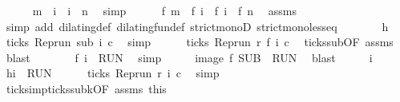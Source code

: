 \begin{isabellebody}
\ \ \ \ \isamarkupfalse%
\ {\isacartoucheopen}m\ {\isacharless}\ i\ {\isasymand}\ i\ {\isacharless}\ n{\isacartoucheclose}\ \isamarkupfalse%
\ simp\isanewline
\ \ \ \ \isamarkupfalse%
\ {\isacartoucheopen}f\ m\ {\isacharless}\ f\ i\ {\isasymand}\ f\ i\ {\isacharless}\ {\isacharparenleft}f\ n{\isacharparenright}{\isacartoucheclose}\ \isamarkupfalse%
\ assms\isanewline
\ \ \ \ \ \ \isamarkupfalse%
\ {\isacharparenleft}simp\ add{\isacharcolon}\ dilating{\isacharunderscore}def\ dilating{\isacharunderscore}fun{\isacharunderscore}def\ strict{\isacharunderscore}monoD\ strict{\isacharunderscore}mono{\isacharunderscore}less{\isacharunderscore}eq{\isacharparenright}\isanewline
\ \ \ \ \isamarkupfalse%
\ \isamarkupfalse%
\ h\ \isamarkupfalse%
\ {\isacartoucheopen}ticks\ {\isacharparenleft}{\isacharparenleft}Rep{\isacharunderscore}run\ sub{\isacharparenright}\ i\ c{\isacharparenright}{\isacartoucheclose}\ \isamarkupfalse%
\ simp\isanewline
\ \ \ \ \isamarkupfalse%
\ {\isacartoucheopen}ticks\ {\isacharparenleft}{\isacharparenleft}Rep{\isacharunderscore}run\ r{\isacharparenright}\ {\isacharparenleft}f\ i{\isacharparenright}\ c{\isacharparenright}{\isacartoucheclose}\ \isamarkupfalse%
\ ticks{\isacharunderscore}sub{\isacharbrackleft}OF\ assms{\isacharbrackright}\ \isamarkupfalse%
\ blast\isanewline
\ \ \ \ \isamarkupfalse%
\ \isamarkupfalse%
\ {\isacartoucheopen}f\ i\ {\isasymin}\ {\isacharquery}RUN{\isacartoucheclose}\ \isamarkupfalse%
\ simp\isanewline
\ \ \isacommand{{\isacharbraceright}}\isamarkupfalse%
\ \isamarkupfalse%
\ {\isacartoucheopen}image\ f\ {\isacharquery}SUB\ {\isasymsubseteq}\ {\isacharquery}RUN{\isacartoucheclose}\ \isamarkupfalse%
\ blast\isanewline
{}\isamarkupfalse%
\isanewline
\ \ \isacommand{{\isacharbraceleft}}\isamarkupfalse%
\ \isamarkupfalse%
\ i\ \isamarkupfalse%
\ h{\isacharcolon}{\isacartoucheopen}i\ {\isasymin}\ {\isacharquery}RUN{\isacartoucheclose}\isanewline
\ \ \ \ \isamarkupfalse%
\ {\isacartoucheopen}ticks\ {\isacharparenleft}{\isacharparenleft}Rep{\isacharunderscore}run\ r{\isacharparenright}\ i\ c{\isacharparenright}{\isacartoucheclose}\ \isamarkupfalse%
\ simp\isanewline
\ \ \ \ \isamarkupfalse%
\ ticks{\isacharunderscore}imp{\isacharunderscore}ticks{\isacharunderscore}subk{\isacharbrackleft}OF\ assms\ this{\isacharbrackright}\isanewline

\end{isabellebody}
